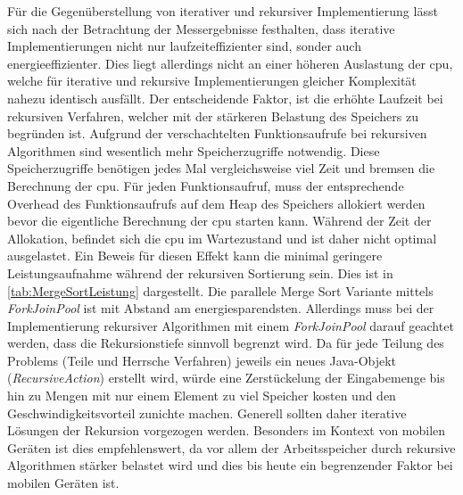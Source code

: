 Für die Gegenüberstellung von iterativer und rekursiver Implementierung lässt sich nach der Betrachtung der Messergebnisse festhalten, dass iterative Implementierungen nicht nur laufzeiteffizienter sind, sonder auch energieeffizienter. Dies liegt allerdings nicht an einer höheren Auslastung der \ac{cpu}, welche für iterative und rekursive Implementierungen gleicher Komplexität nahezu identisch ausfällt. Der entscheidende Faktor, ist die erhöhte Laufzeit bei rekursiven Verfahren, welcher mit der stärkeren Belastung des Speichers zu begründen ist. Aufgrund der verschachtelten Funktionsaufrufe bei rekursiven Algorithmen sind wesentlich mehr Speicherzugriffe notwendig. Diese Speicherzugriffe benötigen jedes Mal vergleichsweise viel Zeit und bremsen die Berechnung der \ac{cpu}. Für jeden Funktionsaufruf, muss der entsprechende Overhead des Funktionsaufrufs auf dem Heap des Speichers allokiert werden bevor die eigentliche Berechnung der \ac{cpu} starten kann. Während der Zeit der Allokation, befindet sich die \ac{cpu} im Wartezustand und ist daher nicht optimal ausgelastet. Ein Beweis für diesen Effekt kann die minimal geringere Leistungsaufnahme während der rekursiven Sortierung sein. Dies ist in \autoref{tab:MergeSortLeistung} dargestellt. Die parallele Merge Sort Variante mittels \emph{ForkJoinPool} ist mit Abstand am energiesparendsten. Allerdings muss bei der Implementierung rekursiver Algorithmen mit einem \emph{ForkJoinPool} darauf geachtet werden, dass die Rekursionstiefe sinnvoll begrenzt wird. Da für jede Teilung des Problems (Teile und Herrsche Verfahren) jeweils ein neues Java-Objekt (\emph{RecursiveAction}) erstellt wird, würde eine Zerstückelung der Eingabemenge bis hin zu Mengen mit nur einem Element zu viel Speicher kosten und den Geschwindigkeitsvorteil zunichte machen. Generell sollten daher iterative Lösungen der Rekursion vorgezogen werden. Besonders im Kontext von mobilen Geräten ist dies empfehlenswert, da vor allem der Arbeitsspeicher durch rekursive Algorithmen stärker belastet wird und dies bis heute ein begrenzender Faktor bei mobilen Geräten ist.